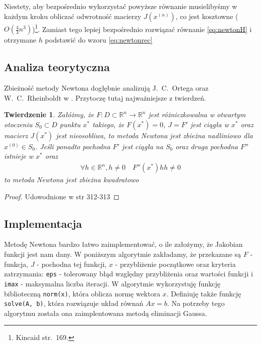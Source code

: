 \documentclass[11pt,wide]{mwart}
\newtheorem{tw}{Twierdzenie}
\begin{document}
\noindent Niestety, aby bezpośrednio wykorzystać powyższe równanie musielibyśmy w każdym kroku  obliczać odwrotność macierzy $ J(x^{(n)}) $, co jest kosztowne ($ O(\frac{4}{3}n^3) $)\footnote{\cite{kincaid} Kincaid str.~169.}. Zamiast tego lepiej bezpośrednio rozwiązać równanie \eqref{eq:newtonH} i otrzymane $ h $ podstawić do wzoru \eqref{eq:newtonrec}

\subsection{Analiza teorytyczna}

Zbieżność metody Newtona dogłębnie analizują J.~C.~Ortega oraz W.~C.~Rheinboldt w \cite{ortega}. Przytoczę tutaj najważniejsze z twierdzeń.

\begin{tw}
Załóżmy, że $ F : D \subset \mathbb{R}^n \rightarrow \mathbb{R}^n $ jest różniczkowalna w otwartym otoczeniu $ S_0 \subset D $ punktu $ x^* $ takiego, że $ F(x^*) = 0 $, $ J = F' $ jest ciągła w $ x^* $ oraz macierz $ J(x^*) $ jest nieosobliwa, to metoda Newtona jest zbieżna nadliniowo dla $ x^{(0)} \in S_0 $. Jeśli ponadto pochodna $ F' $ jest ciągła na $ S_0 $ oraz druga pochodna $ F'' $ istnieje w $ x^* $ oraz 
\begin{align}
	\forall h \in \mathbb{R}^n, h \neq 0 \quad F''(x^*)hh \neq 0
\end{align}
to metoda Newtona jest zbieżna kwadratowo
\end{tw}

\begin{proof}
	Udowodnione w \cite{ortega} str 312-313
\end{proof}

\subsection{Implementacja}

Metodę Newtona bardzo łatwo zaimplementować, o ile założymy, że Jakobian funkcji jest nam dany. W poniższym algorytmie zakładamy, że przekazane są $ F $ - funkcja, $ J $ - pochodna tej funkcji, $ x $ - przybliżenie początkowe oraz kryteria zatrzymania: \texttt{eps} - tolerowany błąd względny przybliżenia oraz wartości funkcji i \texttt{imax} - maksymalna liczba iteracji. W algorytmie wykorzystuję funkcję biblioteczną \texttt{norm(x)}, która oblicza normę wektora $ x $. Definiuję także funkcję \texttt{solve(A, b)}, która rozwiązuje układ równań $ Ax = b $. Na potrzeby tego algorytmu została ona zaimplentowana metodą eliminacji Gaussa.
\end{document}
